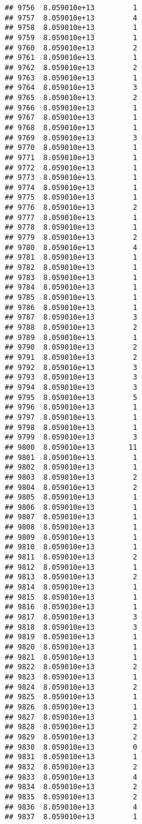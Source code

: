 \documentclass[
]{article}
\begin{document}
\begin{verbatim}
## 9756  8.059010e+13         1
## 9757  8.059010e+13         4
## 9758  8.059010e+13         1
## 9759  8.059010e+13         1
## 9760  8.059010e+13         2
## 9761  8.059010e+13         1
## 9762  8.059010e+13         2
## 9763  8.059010e+13         1
## 9764  8.059010e+13         3
## 9765  8.059010e+13         2
## 9766  8.059010e+13         1
## 9767  8.059010e+13         1
## 9768  8.059010e+13         1
## 9769  8.059010e+13         3
## 9770  8.059010e+13         1
## 9771  8.059010e+13         1
## 9772  8.059010e+13         1
## 9773  8.059010e+13         1
## 9774  8.059010e+13         1
## 9775  8.059010e+13         1
## 9776  8.059010e+13         2
## 9777  8.059010e+13         1
## 9778  8.059010e+13         1
## 9779  8.059010e+13         2
## 9780  8.059010e+13         4
## 9781  8.059010e+13         1
## 9782  8.059010e+13         1
## 9783  8.059010e+13         1
## 9784  8.059010e+13         1
## 9785  8.059010e+13         1
## 9786  8.059010e+13         1
## 9787  8.059010e+13         3
## 9788  8.059010e+13         2
## 9789  8.059010e+13         1
## 9790  8.059010e+13         2
## 9791  8.059010e+13         2
## 9792  8.059010e+13         3
## 9793  8.059010e+13         3
## 9794  8.059010e+13         3
## 9795  8.059010e+13         5
## 9796  8.059010e+13         1
## 9797  8.059010e+13         1
## 9798  8.059010e+13         1
## 9799  8.059010e+13         3
## 9800  8.059010e+13        11
## 9801  8.059010e+13         1
## 9802  8.059010e+13         1
## 9803  8.059010e+13         2
## 9804  8.059010e+13         2
## 9805  8.059010e+13         1
## 9806  8.059010e+13         1
## 9807  8.059010e+13         1
## 9808  8.059010e+13         1
## 9809  8.059010e+13         1
## 9810  8.059010e+13         1
## 9811  8.059010e+13         2
## 9812  8.059010e+13         1
## 9813  8.059010e+13         2
## 9814  8.059010e+13         1
## 9815  8.059010e+13         1
## 9816  8.059010e+13         1
## 9817  8.059010e+13         3
## 9818  8.059010e+13         3
## 9819  8.059010e+13         1
## 9820  8.059010e+13         1
## 9821  8.059010e+13         1
## 9822  8.059010e+13         2
## 9823  8.059010e+13         1
## 9824  8.059010e+13         2
## 9825  8.059010e+13         1
## 9826  8.059010e+13         1
## 9827  8.059010e+13         1
## 9828  8.059010e+13         2
## 9829  8.059010e+13         2
## 9830  8.059010e+13         0
## 9831  8.059010e+13         1
## 9832  8.059010e+13         2
## 9833  8.059010e+13         4
## 9834  8.059010e+13         2
## 9835  8.059010e+13         2
## 9836  8.059010e+13         4
## 9837  8.059010e+13         1

\end{verbatim}
\end{document}
